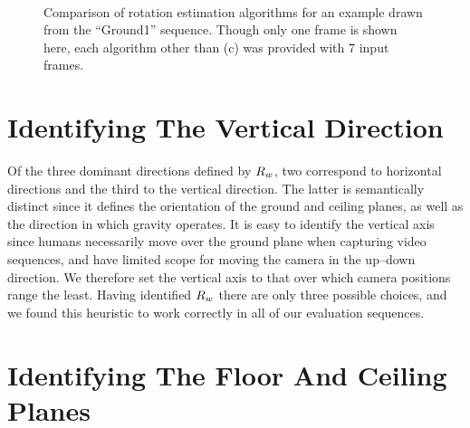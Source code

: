 \begin{figure}[p]
  \centering
  \quad
  \\
  \quad
  \caption{Comparison of rotation estimation algorithms for an example
    drawn from the ``Ground1'' sequence. Though only one frame is
    shown here, each algorithm other than (c) was provided with 7
    input frames.}
  \label{fig:vpt-example3}
\end{figure}

\section{Identifying The Vertical Direction}
Of the three dominant directions defined by $\SceneR$, two correspond to
horizontal directions and the third to the vertical direction. The
latter is semantically distinct since it defines the orientation of
the ground and ceiling planes, as well as the direction in which
gravity operates. It is easy to identify the vertical axis since
humans necessarily move over the ground plane when capturing video
sequences, and have limited scope for moving the camera in the
up--down direction. We therefore set the vertical axis to that over
which camera positions range the least. Having identified $\SceneR$ there
are only three possible choices, and we found this heuristic to work
correctly in all of our evaluation sequences.

\section{Identifying The Floor And Ceiling Planes}
\label{sect:fcmap}

\begin{figure}[tb]
  \centering
  \quad
  \caption{}
  \label{fig:fcmap}
\end{figure}

